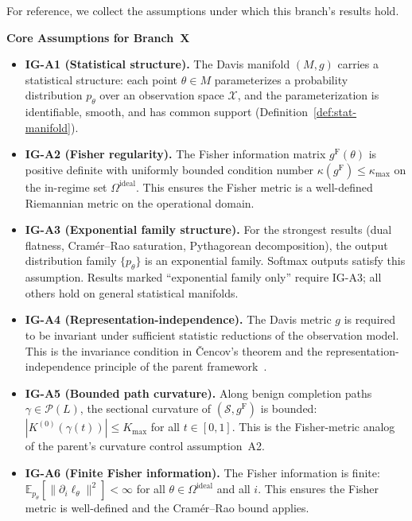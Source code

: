\documentclass[11pt]{article}
\newcommand{\E}{\mathbb{E}}
\newcommand{\gF}{g^{\mathrm{F}}}
\theoremstyle{remark}
\begin{document}
For reference, we collect the assumptions under which this branch's results
hold.

\begin{samepage}
\begin{mdframed}[linewidth=0.5pt]
\noindent\textbf{Core Assumptions for Branch~X}
\begin{itemize}[leftmargin=*]
  \item \textbf{IG-A1 (Statistical structure).} The Davis manifold $(M, g)$
  carries a statistical structure: each point $\theta \in M$ parameterizes a
  probability distribution $p_\theta$ over an observation space $\mathcal{X}$,
  and the parameterization is identifiable, smooth, and has common support
  (Definition~\ref{def:stat-manifold}).

  \item \textbf{IG-A2 (Fisher regularity).} The Fisher information matrix
  $\gF(\theta)$ is positive definite with uniformly bounded condition number
  $\kappa(\gF) \le \kappa_{\max}$ on the in-regime set $\Omega^{\mathrm{ideal}}$.
  This ensures the Fisher metric is a well-defined Riemannian metric on the
  operational domain.

  \item \textbf{IG-A3 (Exponential family structure).}  For the strongest
  results (dual flatness, Cram\'er--Rao saturation, Pythagorean decomposition),
  the output distribution family $\{p_\theta\}$ is an exponential family.
  Softmax outputs satisfy this assumption.  Results marked ``exponential family
  only'' require IG-A3; all others hold on general statistical manifolds.

  \item \textbf{IG-A4 (Representation-independence).} The Davis metric $g$ is
  required to be invariant under sufficient statistic reductions of the
  observation model.  This is the invariance condition in \v{C}encov's theorem
  and the representation-independence principle of the parent
  framework~\cite{davis2025manifold}.

  \item \textbf{IG-A5 (Bounded path curvature).}  Along benign completion paths
  $\gamma \in \mathcal{P}(L)$, the sectional curvature of $(\mathcal{S}, \gF)$
  is bounded: $|K^{(0)}(\gamma(t))| \le K_{\max}$ for all $t \in [0,1]$.
  This is the Fisher-metric analog of the parent's curvature control
  assumption~A2.

  \item \textbf{IG-A6 (Finite Fisher information).}  The Fisher information is
  finite: $\E_{p_\theta}[\|\partial_i \ell_\theta\|^2] < \infty$ for all
  $\theta \in \Omega^{\mathrm{ideal}}$ and all $i$.  This ensures the Fisher
  metric is well-defined and the Cram\'er--Rao bound applies.
\end{itemize}
\end{mdframed}
\end{samepage}
\end{document}
